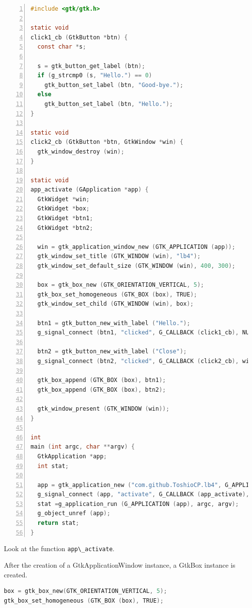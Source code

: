 \begin{lstlisting}[language=C, numbers=left]
#include <gtk/gtk.h>

static void
click1_cb (GtkButton *btn) {
  const char *s;

  s = gtk_button_get_label (btn);
  if (g_strcmp0 (s, "Hello.") == 0)
    gtk_button_set_label (btn, "Good-bye.");
  else
    gtk_button_set_label (btn, "Hello.");
}

static void
click2_cb (GtkButton *btn, GtkWindow *win) {
  gtk_window_destroy (win);
}

static void
app_activate (GApplication *app) {
  GtkWidget *win;
  GtkWidget *box;
  GtkWidget *btn1;
  GtkWidget *btn2;

  win = gtk_application_window_new (GTK_APPLICATION (app));
  gtk_window_set_title (GTK_WINDOW (win), "lb4");
  gtk_window_set_default_size (GTK_WINDOW (win), 400, 300);

  box = gtk_box_new (GTK_ORIENTATION_VERTICAL, 5);
  gtk_box_set_homogeneous (GTK_BOX (box), TRUE);
  gtk_window_set_child (GTK_WINDOW (win), box);

  btn1 = gtk_button_new_with_label ("Hello.");
  g_signal_connect (btn1, "clicked", G_CALLBACK (click1_cb), NULL);

  btn2 = gtk_button_new_with_label ("Close");
  g_signal_connect (btn2, "clicked", G_CALLBACK (click2_cb), win);

  gtk_box_append (GTK_BOX (box), btn1);
  gtk_box_append (GTK_BOX (box), btn2);

  gtk_window_present (GTK_WINDOW (win));
}

int
main (int argc, char **argv) {
  GtkApplication *app;
  int stat;

  app = gtk_application_new ("com.github.ToshioCP.lb4", G_APPLICATION_DEFAULT_FLAGS);
  g_signal_connect (app, "activate", G_CALLBACK (app_activate), NULL);
  stat =g_application_run (G_APPLICATION (app), argc, argv);
  g_object_unref (app);
  return stat;
}
\end{lstlisting}

Look at the function \passthrough{\lstinline!app\_activate!}.

After the creation of a GtkApplicationWindow instance, a GtkBox instance
is created.

\begin{lstlisting}[language=C]
box = gtk_box_new(GTK_ORIENTATION_VERTICAL, 5);
gtk_box_set_homogeneous (GTK_BOX (box), TRUE);
\end{lstlisting}

